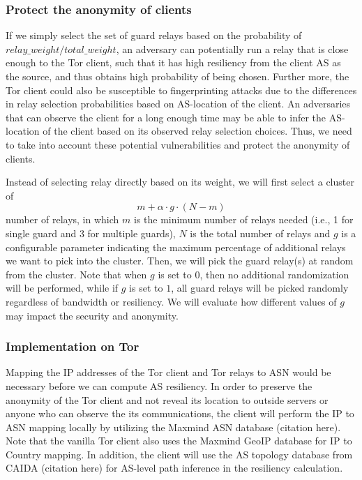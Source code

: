 \subsubsection{Protect the anonymity of clients}

If we simply select the set of guard relays based on the probability of $relay\_weight/total\_weight$, an adversary can potentially run a relay that is close enough to the Tor client, such that it has high resiliency from the client AS as the source, and thus obtains high probability of being chosen. Further more, the Tor client could also be susceptible to fingerprinting attacks due to the differences in relay selection probabilities based on AS-location of the client. An adversaries that can observe the client for a long enough time may be able to infer the AS-location of the client based on its observed relay selection choices. Thus, we need to take into account these potential vulnerabilities and protect the anonymity of clients. 

Instead of selecting relay directly based on its weight, we will first select a cluster of 
\begin{equation*}
m + \alpha \cdot g \cdot (N - m)
\end{equation*}
number of relays, in which $m$ is the minimum number of relays needed (i.e., 1 for single guard and 3 for multiple guards), $N$ is the total number of relays and $g$ is a configurable parameter indicating the maximum percentage of additional relays we want to pick into the cluster. Then, we will pick the guard relay(s) at random from the cluster. Note that when $g$ is set to $0$, then no additional randomization will be performed, while if $g$ is set to $1$, all guard relays will be picked randomly regardless of bandwidth or resiliency. We will evaluate how different values of $g$ may impact the security and anonymity.

\subsubsection{Implementation on Tor}
Mapping the IP addresses of the Tor client and Tor relays to ASN would be necessary before we can compute AS resiliency. In order to preserve the anonymity of the Tor client and not reveal its location to outside servers or anyone who can observe the its communications, the client will perform the IP to ASN mapping locally by utilizing the Maxmind ASN database (citation here). Note that the vanilla Tor client also uses the Maxmind GeoIP database for IP to Country mapping. In addition, the client will use the AS topology database from CAIDA (citation here) for AS-level path inference in the resiliency calculation. 

